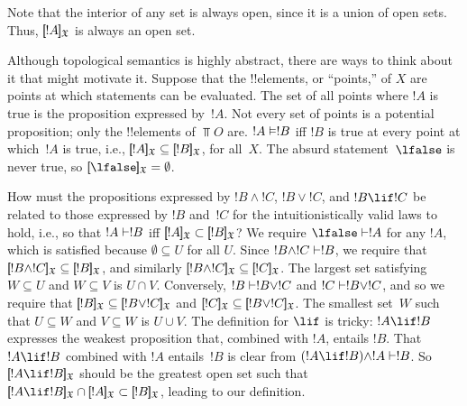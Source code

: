 \documentclass[../../../include/open-logic-section]{subfiles}
\begin{document}
Note that the interior of any set is always open, since it is a union
of open sets. Thus, $\Prop{X}{!A}$ is always an open set.

Although topological semantics is highly abstract, there are ways to
think about it that might motivate it. Suppose that the !!{element}s,
or ``points,'' of $X$ are points at which statements can be
evaluated. The set of all points where $!A$ is true is the proposition
expressed by~$!A$. Not every set of points is a potential proposition;
only the !!{element}s of $\Top{O}$ are.  $!A \Entails !B$ iff $!B$ is
true at every point at which~$!A$ is true, i.e., $\Prop{X}{!A}
\subseteq \Prop{X}{!B}$, for all~$X$. The absurd statement~$\lfalse$
is never true, so $\Prop{X}{\lfalse} = \emptyset$.

How must the propositions expressed by $!B \land !C$, $!B \lor !C$,
and $!B \lif !C$ be related to those expressed by $!B$ and~$!C$ for
the intuitionistically valid laws to hold, i.e., so that $!A \Proves
!B$ iff $\Prop{X}{!A} \subset \Prop{X}{!B}$? We require $\lfalse
\Proves !A$ for any $!A$, which is satisfied because $\emptyset
\subseteq U$ for all $U$.  Since $!B \land !C \Proves !B$, we require
that $\Prop{X}{!B \land !C} \subseteq \Prop{X}{!B}$, and similarly
$\Prop{X}{!B \land !C} \subseteq \Prop{X}{!C}$. The largest set
satisfying $W \subseteq U$ and $W \subseteq V$ is $U \cap V$.
Conversely, $!B \Proves !B \lor !C$ and $!C \Proves !B \lor !C$, and
so we require that $\Prop{X}{!B} \subseteq \Prop{X}{!B \lor !C}$ and
$\Prop{X}{!C} \subseteq \Prop{X}{!B \lor !C}$. The smallest set~$W$
such that $U \subseteq W$ and $V \subseteq W$ is $U \cup V$.  The
definition for $\lif$ is tricky: $!A \lif !B$ expresses the weakest
proposition that, combined with $!A$, entails $!B$. That $!A \lif !B$
combined with $!A$ entails~$!B$ is clear from $(!A \lif !B) \land !A
\Proves !B $. So $\Prop{X}{!A \lif !B}$ should be the greatest open
set such that $\Prop{X}{!A \lif !B} \cap \Prop{X}{!A} \subset
\Prop{X}{!B}$, leading to our definition.
\end{document}
